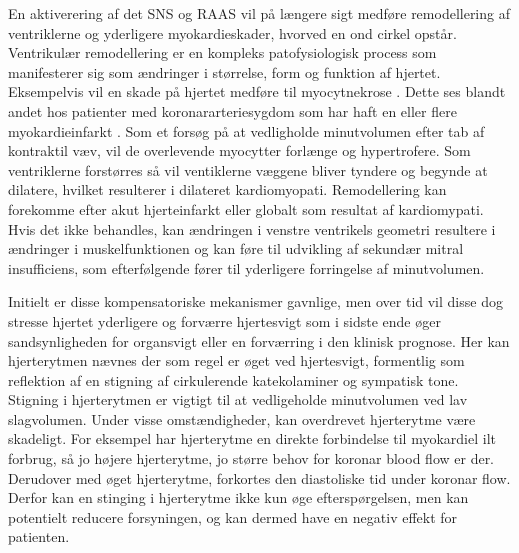 En aktiverering af det SNS og RAAS vil på længere sigt medføre remodellering af ventriklerne og yderligere myokardieskader, hvorved en ond cirkel opstår. \citep{Braunwald2013} Ventrikulær remodellering er en kompleks patofysiologisk process som manifesterer sig som ændringer i størrelse, form og funktion af hjertet. Eksempelvis vil en skade på hjertet medføre til  myocytnekrose \citep{Cohn2000}. Dette ses blandt andet hos patienter med koronararteriesygdom som har haft en eller flere myokardieinfarkt \citep{Page1971}. Som et forsøg på at vedligholde minutvolumen efter tab af kontraktil væv, vil de overlevende myocytter forlænge og hypertrofere. Som ventriklerne forstørres så vil ventiklerne væggene bliver tyndere og begynde at dilatere, hvilket resulterer i dilateret kardiomyopati. \citep{Cohn2000} Remodellering kan forekomme efter akut hjerteinfarkt eller globalt som resultat af kardiomypati. Hvis det ikke behandles, kan ændringen i venstre ventrikels geometri resultere i ændringer i muskelfunktionen og kan føre til udvikling af sekundær mitral insufficiens, som efterfølgende fører til yderligere forringelse af minutvolumen. \citep{Gheorghiade1998}

Initielt er disse kompensatoriske mekanismer gavnlige, men over tid vil disse dog stresse hjertet yderligere og forværre hjertesvigt \citep{Mccance1998} som i sidste ende øger sandsynligheden for organsvigt eller en forværring i den klinisk prognose\citep{Mudd2008}. Her kan hjerterytmen nævnes der som regel er øget ved hjertesvigt, formentlig som reflektion af en stigning af cirkulerende katekolaminer og sympatisk tone. Stigning i hjerterytmen er vigtigt til at vedligeholde minutvolumen ved lav slagvolumen. Under visse omstændigheder, kan overdrevet  hjerterytme være skadeligt. For eksempel har hjerterytme en direkte forbindelse til myokardiel ilt forbrug, så jo højere hjerterytme, jo større behov for koronar blood flow er der. Derudover med øget hjerterytme, forkortes den diastoliske tid under koronar flow. Derfor kan en stinging i hjerterytme ikke kun øge efterspørgelsen, men kan potentielt reducere forsyningen, og kan dermed have en negativ effekt for patienten. \citep{Parmley1985}




